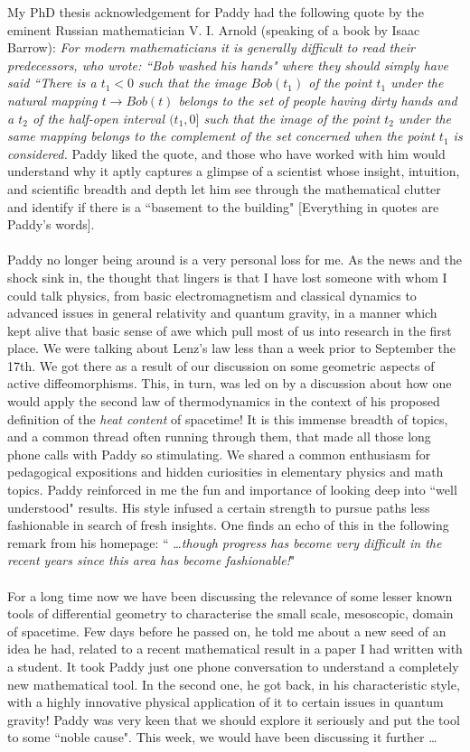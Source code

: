 \documentclass[prd, preprint, longbibliography, 11pt]{revtex4-1}
\begin{document}
\noindent My PhD thesis acknowledgement for Paddy had the following quote by the eminent Russian mathematician V. I. Arnold (speaking of a book by Isaac Barrow): \textit{For modern mathematicians it is generally difficult to read their predecessors, who wrote: “Bob washed his hands" where they should simply have said “There is a $t_1 < 0$ such that the image $Bob(t_1)$ of the point $t_1$ under the natural mapping $t \to Bob(t)$ belongs to the set of people having dirty hands and a $t_2$ of the half-open interval $(t_1, 0]$ such that the image of the point $t_2$ under the same mapping belongs to the complement of the set concerned when the point $t_1$ is considered.} Paddy liked the quote, and those who have worked with him would understand why it aptly captures a glimpse of a scientist whose insight, intuition, and scientific breadth and depth let him see through the mathematical clutter and identify if there is a ``basement to the building" [Everything in quotes are Paddy's words].
\\
\\
Paddy no longer being around is a very personal loss for me. As the news and the shock sink in, the thought that lingers is that I have lost someone with whom I could talk physics, from basic electromagnetism and classical dynamics to advanced issues in general relativity and quantum gravity, in a manner which kept alive that basic sense of awe which pull most of us into research in the first place. We were talking about Lenz's law less than a week prior to September the 17th. We got there as a result of our discussion on some geometric aspects of active diffeomorphisms. This, in turn, was led on by a discussion about how one would apply the second law of thermodynamics in the context of his proposed definition of the {\it heat content} of spacetime! It is this immense breadth of topics, and a common thread often running through them, that made all those long phone calls with Paddy so stimulating. We shared a common enthusiasm for pedagogical expositions and hidden curiosities in elementary physics and math topics. Paddy reinforced in me the fun and importance of looking deep into ``well understood" results. His style infused a certain strength to pursue paths less fashionable in search of fresh insights. One finds an echo of this in the following remark from his homepage: `` \ldots \textit{though progress has become very difficult in the recent years since this area has become fashionable!}" 
\\
\\
For a long time now we have been discussing the relevance of some lesser known tools of differential geometry to characterise the small scale, mesoscopic, domain of spacetime. Few days before he passed on, he told me about a new seed of an idea he had, related to a recent mathematical result in a paper I had written with a student. It took Paddy just one phone conversation to understand a completely new mathematical tool. In the second one, he got back, in his characteristic style, with a highly innovative physical application of it to certain issues in quantum gravity! Paddy was very keen that we should explore it seriously and put the tool to some ``noble cause". This week, we would have been discussing it further \ldots
\end{document}
